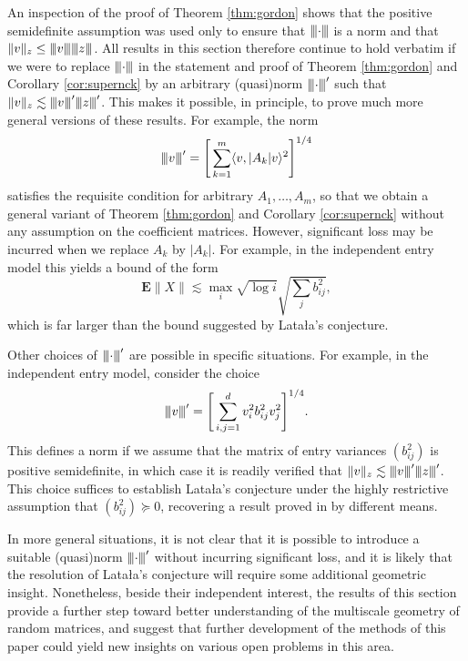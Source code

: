 \documentclass[10pt,reqno]{amsart}
\theoremstyle{definition}
\numberwithin{equation}{section}
\numberwithin{figure}{section}
\numberwithin{table}{section}
\newcommand{\mynegspace}{\hspace{-0.12em}}
\newcommand{\vvv}{\rvert\mynegspace\rvert\mynegspace\rvert}
\newcommand{\nnn}[1]{{\vvv #1 \vvv}}
\begin{document}
An inspection of the proof of Theorem \ref{thm:gordon} shows that the 
positive semidefinite assumption was used only to ensure that 
$\nnn{\cdot}$ is a norm and that $\|v\|_z\le\nnn{v}\nnn{z}$. All results 
in this section therefore continue to hold verbatim if we were to replace 
$\nnn{\cdot}$ in the statement and proof of Theorem \ref{thm:gordon} and 
Corollary \ref{cor:supernck} by an arbitrary (quasi)norm $\nnn{\cdot}'$ 
such that $\|v\|_z\lesssim \nnn{v}'\nnn{z}'$. This makes it possible, in 
principle, to prove much more general versions of these results. For 
example, the norm
$$
	\nnn{v}' = \Bigg[\sum_{k=1}^m \langle v,|A_k|v\rangle^2
	\Bigg]^{1/4}
$$
satisfies the requisite condition for arbitrary $A_1,\ldots,A_m$, so that 
we obtain a general variant of Theorem \ref{thm:gordon} and
Corollary \ref{cor:supernck} without any assumption on the coefficient 
matrices. However, significant loss may be incurred when we replace
$A_k$ by $|A_k|$. For example, in the 
independent entry model this yields a bound of the form
$$
	\mathbf{E}\|X\| \lesssim
	\max_i\sqrt{\log i}\sqrt{\sum_j b_{ij}^2},
$$
which is far larger than the bound suggested by Lata{\l}a's conjecture.

Other choices of $\nnn{\cdot}'$ are possible in specific situations. For 
example, in the independent entry model, consider the choice
$$
	\nnn{v}' = \Bigg[\sum_{i,j=1}^d v_i^2b_{ij}^2v_j^2
        \Bigg]^{1/4}.
$$
This defines a norm if we assume that the matrix of entry variances 
$(b_{ij}^2)$ is positive semidefinite, in which case it is readily 
verified that $\|v\|_z\lesssim \nnn{v}'\nnn{z}'$. This choice suffices to
establish Lata{\l}a's conjecture under the highly restrictive assumption 
that $(b_{ij}^2)\succeq 0$, recovering a result proved in \cite{vH16b} by 
different means.

In more general situations, it is not clear that it is possible to 
introduce a suitable (quasi)norm $\nnn{\cdot}'$ without incurring 
significant loss, and it is likely that the resolution of Lata{\l}a's 
conjecture will require some additional geometric insight. Nonetheless, 
beside their independent interest, the results of this section provide a 
further step toward better understanding of the multiscale geometry of 
random matrices, and suggest that further development of the methods of 
this paper could yield new insights on various open problems in this area.
\end{document}
